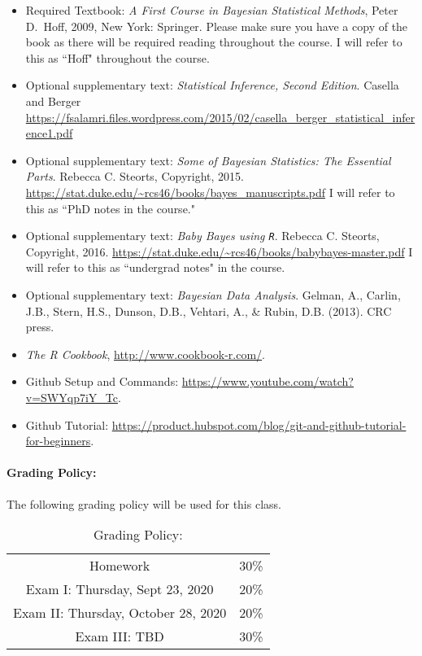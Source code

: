 \documentclass[11pt]{article}
\begin{document}
\begin{itemize}
\item[] Required Textbook: \textit{A First Course in Bayesian Statistical Methods}, Peter D.\ Hoff, 2009, New York: Springer. Please make sure you have a copy of the book as there will be required reading throughout the course. I will refer to this as ``Hoff" throughout the course. 
\item[] Optional supplementary text:  \textit{Statistical Inference, Second Edition}. Casella and Berger \url{https://fsalamri.files.wordpress.com/2015/02/casella_berger_statistical_inference1.pdf}
\item[] Optional supplementary text:  \textit{Some of Bayesian Statistics: The Essential Parts}. Rebecca C. Steorts, Copyright, 2015. \url{https://stat.duke.edu/~rcs46/books/bayes_manuscripts.pdf} I will refer to this as ``PhD notes in the course."
\item[] Optional supplementary text:  \textit{Baby Bayes using \texttt{R}}. Rebecca C. Steorts, Copyright, 2016. 
\url{https://stat.duke.edu/~rcs46/books/babybayes-master.pdf} I will refer to this as ``undergrad notes" in the course. 
\item[] Optional supplementary text:  \textit{Bayesian Data Analysis}. Gelman, A., Carlin, J.B., Stern, H.S., Dunson, D.B., Vehtari, A., \& Rubin, D.B. (2013). CRC press.
\item[] \emph{The R Cookbook}, \url{http://www.cookbook-r.com/}.
\item[] Github Setup and Commands: \url{https://www.youtube.com/watch?v=SWYqp7iY_Tc}.
\item[] Github Tutorial: \url{https://product.hubspot.com/blog/git-and-github-tutorial-for-beginners}.

\end{itemize}

\paragraph{Grading Policy:} 
The following grading policy will be used for this class. 

\begin{table}[h!]
\caption{Grading Policy:}
\begin{center}
\begin{tabular}{cc}
Homework &30\%\\
Exam I:  Thursday, Sept 23, 2020 &20\%\\
Exam  II: Thursday, October 28, 2020 & 20\%\\
Exam III:  TBD & 30\%\\
\end{tabular}
\end{center}
\label{default}
\end{table}%
\end{document}
